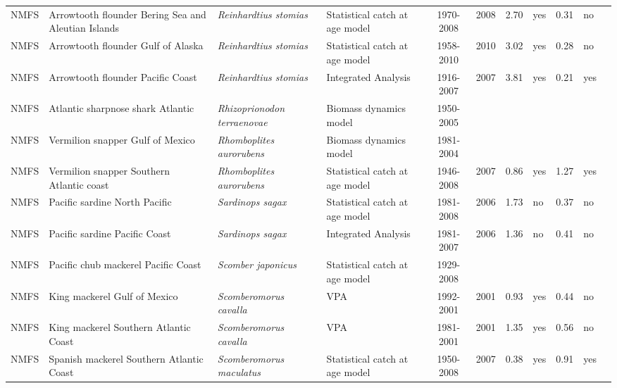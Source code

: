\begin{longtable}{p{1.8cm}p{3.5cm}p{3.5cm}p{3cm}cccp{0.9cm}cp{0.9cm}c}
  NMFS & Arrowtooth flounder Bering Sea and Aleutian Islands & \textit{Reinhardtius stomias} & Statistical catch at age model & 1970-2008 & 2008 & 2.70 & yes & 0.31 & no & \cite{AFSC-ARFLOUNDBSAI-2007-Arrowtooth flounder BSAI.pdf} \\ 
  NMFS & Arrowtooth flounder Gulf of Alaska & \textit{Reinhardtius stomias} & Statistical catch at age model & 1958-2010 & 2010 & 3.02 & yes & 0.28 & no & \cite{2008_SAFE_GOAatf.pdf} \\ 
  NMFS & Arrowtooth flounder Pacific Coast & \textit{Reinhardtius stomias} & Integrated Analysis & 1916-2007 & 2007 & 3.81 & yes & 0.21 & yes & \cite{NWFSC-ARFLOUNDPCOAST-2007-Arrowtooth flounder.pdf} \\ 
  NMFS & Atlantic sharpnose shark Atlantic & \textit{Rhizoprionodon terraenovae} & Biomass dynamics model & 1950-2005 &  &  &  &  &  & \cite{SmallcoastalAtl2007-SEFSC.pdf} \\ 
  NMFS & Vermilion snapper Gulf of Mexico & \textit{Rhomboplites aurorubens} & Biomass dynamics model & 1981-2004 &  &  &  &  &  & \cite{JENSEN_VSNAPGM_2006.pdf} \\ 
  NMFS & Vermilion snapper Southern Atlantic coast & \textit{Rhomboplites aurorubens} & Statistical catch at age model & 1946-2008 & 2007 & 0.86 & yes & 1.27 & yes & \cite{2008_SEDAR_VermillionSnapper_Satl.pdf} \\ 
  NMFS & Pacific sardine North Pacific & \textit{Sardinops sagax} & Statistical catch at age model & 1981-2008 & 2006 & 1.73 & no & 0.37 & no & \cite{2008 pac sardine.pdf} \\ 
  NMFS & Pacific sardine Pacific Coast & \textit{Sardinops sagax} & Integrated Analysis & 1981-2007 & 2006 & 1.36 & no & 0.41 & no & \cite{NOAA-TM-NMFS-SWFSC-413.pdf} \\ 
  NMFS & Pacific chub mackerel Pacific Coast & \textit{Scomber japonicus} & Statistical catch at age model & 1929-2008 &  &  &  &  &  & \cite{PFMC_2008_CPS_SAFE_App2_PMackerel.pdf} \\ 
  NMFS & King mackerel Gulf of Mexico & \textit{Scomberomorus cavalla} & VPA & 1992-2001 & 2001 & 0.93 & yes & 0.44 & no & \cite{JENSEN_KMACKGMSATLC_2004.pdf} \\ 
  NMFS & King mackerel Southern Atlantic Coast & \textit{Scomberomorus cavalla} & VPA & 1981-2001 & 2001 & 1.35 & yes & 0.56 & no & \cite{JENSEN_KMACKGMSATLC_2004.pdf} \\ 
  NMFS & Spanish mackerel Southern Atlantic Coast & \textit{Scomberomorus maculatus} & Statistical catch at age model & 1950-2008 & 2007 & 0.38 & yes & 0.91 & yes & \cite{JENSEN_SPANMACKSATLC_2008.pdf} \\ 

\end{longtable}
